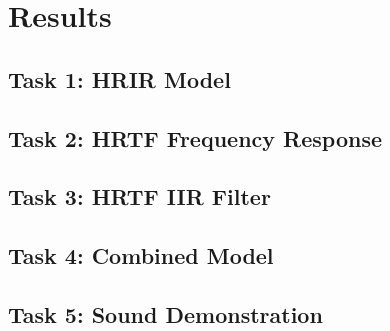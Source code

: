 \chapter{Results}
\label{ch:results}

\section{Task 1: HRIR Model}
\label{sec:results_task1}

\section{Task 2: HRTF Frequency Response}
\label{sec:results_task2}

\section{Task 3: HRTF IIR Filter}
\label{sec:results_task3}

\section{Task 4: Combined Model}
\label{sec:results_task4}

\section{Task 5: Sound Demonstration}
\label{sec:results_task5}


